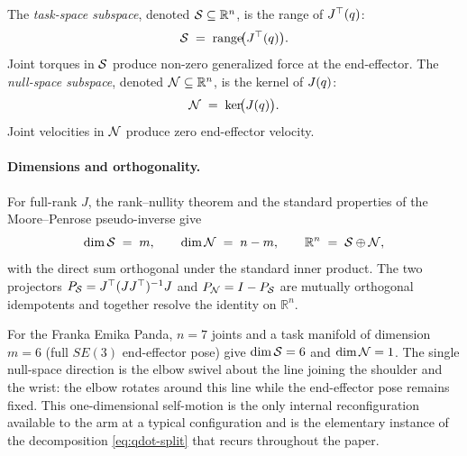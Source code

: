 \begin{definition}\label{def:TS-NS}
The \emph{task-space subspace}, denoted $\mathcal{S} \subseteq \mathbb{R}^{n}$,
is the range of $J^{\top}(q)$:
\begin{equation}
\label{eq:TS-def}
  \mathcal{S} \;=\; \mathrm{range}\!\bigl(J^{\top}(q)\bigr).
\end{equation}
Joint torques in $\mathcal{S}$ produce non-zero generalized force at the
end-effector. The \emph{null-space subspace}, denoted
$\mathcal{N} \subseteq \mathbb{R}^{n}$, is the kernel of $J(q)$:
\begin{equation}
\label{eq:NS-def}
  \mathcal{N} \;=\; \ker\!\bigl(J(q)\bigr).
\end{equation}
Joint velocities in $\mathcal{N}$ produce zero end-effector velocity.
\end{definition}

\paragraph{Dimensions and orthogonality.}
For full-rank $J$, the rank--nullity theorem and the standard
properties of the Moore--Penrose pseudo-inverse give
\begin{equation}
\label{eq:TS-NS-dims}
  \dim \mathcal{S} \;=\; m,
  \qquad
  \dim \mathcal{N} \;=\; n - m,
  \qquad
  \mathbb{R}^{n} \;=\; \mathcal{S} \oplus \mathcal{N},
\end{equation}
with the direct sum orthogonal under the standard inner product.
The two projectors $P_{\mathcal{S}} = J^{\top}(J J^{\top})^{-1} J$ and
$P_{\mathcal{N}} = I - P_{\mathcal{S}}$ are mutually orthogonal idempotents and
together resolve the identity on $\mathbb{R}^{n}$.

\begin{example}\label{ex:franka-elbow}
For the Franka Emika Panda, $n = 7$ joints and a task manifold of
dimension $m = 6$ (full $SE(3)$ end-effector pose) give
$\dim \mathcal{S} = 6$ and $\dim \mathcal{N} = 1$. The single null-space direction
is the elbow swivel about the line joining the shoulder and the
wrist: the elbow rotates around this line while the end-effector
pose remains fixed. This one-dimensional self-motion is the only
internal reconfiguration available to the arm at a typical
configuration and is the elementary instance of the decomposition
\eqref{eq:qdot-split} that recurs throughout the paper.
\end{example}

